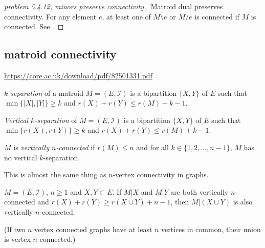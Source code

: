 \begin{proof}[problem 5.4.12, minors preserve connectivity]
    $ $
    \newline
    Matroid dual preserves connectivity.
    For any element $e$, at least one of $M\setminus e$ or $M/e$ is connected if $M$ is connected. See \cite[lemma to theorem II]{crapo_higher_1967}.
\end{proof}
\subsection{matroid connectivity}
\url{https://core.ac.uk/download/pdf/82501331.pdf}

\emph{$k$-separation} of a matroid $M=(E,\mathcal I)$ is a bipartition $\{X,Y\}$ of $E$ such that $\min\{|X|,|Y|\}\geq k$ and $r(X)+r(Y)\leq r(M)+k-1$.

\emph{Vertical $k$-separation} of $M=(E,\mathcal I)$ is a bipartition $\{X,Y\}$ of $E$ such that $\min\{r(X),r(Y)\} \geq k$ and $r(X)+r(Y)\leq r(M)+k-1$.

$M$ is \emph{vertically $n$-connected} if $r(M)\leq n$ and for all $k\in\{1,2,\dots,n-1\}$, $M$ has no vertical $k$-separation.

This is almost the same thing as $n$-vertex connectivity in graphs.


\begin{theorem}
    $M=(E,\mathcal I)$, $n\geq 1$ and $X,Y\subset E$. If $M|X$ and $M|Y$ are both vertically $n$-connected and $r(X)+r(Y)\geq r(X\cup Y)+n-1$, then $M|(X\cup Y)$ is also vertically $n$-connected.
\end{theorem}

(If two $n$ vertex connected graphs have at least $n$ vertices in common, their union is vertex $n$ connected.)



